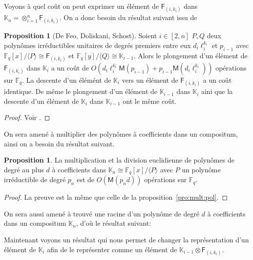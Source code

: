 \documentclass[10pt,a4paper]{book}
\theoremstyle{plain}
\theoremstyle{definition}
\theoremstyle{definition}
\theoremstyle{definition}
\newtheorem{prop}[thm]{Proposition}
\theoremstyle{definition}
\theoremstyle{remark}
\theoremstyle{remark}
\theoremstyle{definition}
\begin{document}
 Voyons à quel coût on peut exprimer un élément de $\mathsf{F}_{(i,k_i)}$ dans 
 $\mathbb{K}_n=\otimes_{i=1}^n\mathsf{F}_{(i,k_i)}$. On a donc 
 besoin du résultat suivant issu de \cite[Theorem 1]{DeFeoDoliskaniSchost14}
 \begin{prop}[De Feo, Doliskani, Schost]
 \label{pro:com:inj}
 Soient $i \in [2,n] $ $P,Q$ deux polynômes irréductibles unitaires de degrés 
 premiers entre eux $d_i\ell_i^{k_i}$ et $p_{i-1}$ avec
   $\mathbb{F}_q[x]/\langle P \rangle \cong \mathsf{F}_{(i,k_i)}$ et 
   $\mathbb{F}_q[y]/\langle Q \rangle \cong \mathbb{K}_{i-1}$. Alors le 
   plongement d'un élément de $\mathsf{F}_{(i,k_i)} $  dans $\mathbb{K}_{i}$ a un
   coût de 
   $O(d_i\ell_i^{k_i}\mathsf{M}(p_{i-1})+p_{i-1}\mathsf{M}(d_i\ell_i^{k_i}))$ 
   opérations sur $\mathbb{F}_q$. La descente d'un élémént de $\mathbb{K}_{i} $
   vers un élément de $\mathsf{F}_{(i,k_i)}$  a un coût identique. 
   De même le plongement d'un élément de $\mathbb{K}_{i-1}$ dans 
   $\mathbb{K}_{i}$ aini que la descente d'un élément de $\mathbb{K}_{i}$ dans 
   $\mathbb{K}_{i-1}$ ont le même coût.
 \end{prop}

 \begin{proof}
 Voir \cite{DeFeoDoliskaniSchost14}.
\end{proof}  

 On sera amené à multiplier des polynômes à coefficients dans un 
 compositum, ainsi on a besoin du résultat suivant.

 \begin{prop}
 \label{pro:mul:com}
 La multiplication et la division euclidienne de polynômes de degré au plus $d$
 à coefficients dans $\mathbb{K}_{n} \cong \mathbb{F}_q[x]/ \langle P \rangle$
 avec $P$ un polynôme irréductible de degré $p_n$ est de $O(\mathsf{M}(p_nd))$ 
 opérations sur $\mathbb{F}_q$.
 \end{prop} 
 
 \begin{proof}
 La preuve est la même que celle de la proposition~\ref{pro:mult:pol}.
 \end{proof}
 
 On sera aussi amené à trouvé une racine d'un polynôme de degré $d$ à 
 coefficients dans un compositum $\mathbb{K}_n$, d'où le résultat suivant:
 
Maintenant voyons un résultat qui nous permet de changer la 
représentation d'un élément de $\mathbb{K}_i$ afin de le représenter comme un 
élément de $\mathbb{K}_{i-1} \otimes \mathsf{F}_{(i,k_i)}$. 
\end{document}
